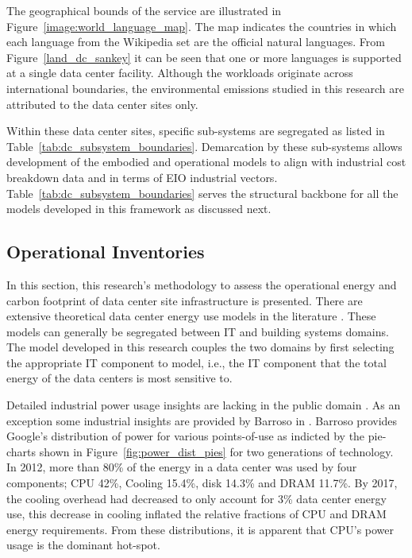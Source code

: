     
    
    The geographical bounds of the service are illustrated in Figure~\ref{image:world_language_map}. The map indicates the countries in which each language from the Wikipedia set are the official natural languages. From Figure~\ref{land_dc_sankey} it can be seen that one or more languages is supported at a single data center facility. Although the workloads originate across international boundaries, the environmental emissions studied in this research are attributed to the data center sites only.  
    
    
    
    Within these data center sites, specific sub-systems are segregated as listed in Table~\ref{tab:dc_subsystem_boundaries}. Demarcation by these sub-systems allows development of the embodied and operational models to align with industrial cost breakdown data and in terms of EIO industrial vectors. Table~\ref{tab:dc_subsystem_boundaries} serves the structural backbone for all the models developed in this framework as discussed next.
    
    
    
    \subsection{Operational Inventories}
    
    
    In this section, this research's methodology to assess the operational energy and carbon footprint of data center site infrastructure is presented. There are extensive theoretical data center energy use models in the literature \cite{dayarathna16, joshi12}. These models can generally be segregated between IT and building systems domains. The model developed in this research couples the two domains by first selecting the appropriate IT component to model, i.e., the IT component that the total energy of the data centers is most sensitive to.
    
    Detailed industrial power usage insights are lacking in the public domain \cite{Masanet20}. As an exception some industrial insights are provided by Barroso in \cite{barroso18, barroso13}. Barroso provides Google's distribution of power for various points-of-use as indicted by the pie-charts shown in Figure~\ref{fig:power_dist_pies} for two generations of technology. In 2012, more than 80\% of the energy in a data center was used by four components; CPU 42\%, Cooling 15.4\%, disk 14.3\% and DRAM 11.7\%. By 2017, the cooling overhead had decreased to only account for 3\% data center energy use, this decrease in cooling inflated the relative fractions of CPU and DRAM energy requirements. From these distributions, it is apparent that CPU's power usage is the dominant hot-spot.  
    
